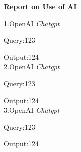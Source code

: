 \documentclass[12pt]{article}
\begin{document}
\begin{center}
\underline{\Large\textbf{Report on Use of AI}}  %
\end{center}

\setlength{\parindent}{0pt}

1.OpenAI \textit{Chatgpt}

Query:123

Output:124
\\

2.OpenAI \textit{Chatgpt}

Query:123

Output:124
\\
3.OpenAI \textit{Chatgpt}

Query:123

Output:124
\end{document}

